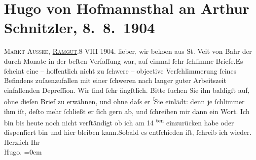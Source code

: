 

         
         \renewcommand{\erwaehntePersonen}{Personen: Hermann Bahr}
         \renewcommand{\erwaehnteOrte}{Orte: Bad Aussee, Ramgut, Sankt Veit, Wien}
         \renewcommand{\erwaehnteWerke}{}
               \section[Hugo von Hofmannsthal an Arthur Schnitzler, 8. 8. 1904]{ Hugo von Hofmannsthal an Arthur Schnitzler, 8. 8. 1904}\nopagebreak{}\rehead{ }\begin{ledgroupsized}[t]{13cm}\normalsize\beginnumbering \toendnotes[C]{\smallbreak\pagebreak[2]} 
\pstart
           {\pb}\textsc{Markt Aussee, \uline{Ramgut}.}\hfill 8 VIII 1904.\pend
           \pstart
           lieber, wir beko{\geminationm}en aus St. Veit von Bahr der durch Monate in der beſten Verfaſſung war, auf einmal ſehr
                    ſchlimme Briefe.\hspace*{1.5em}Es ſcheint eine – hoffentlich
                    nicht zu ſchwere – objective Verſchlimmerung ſeines Befindens zuſa{\geminationm}enzufallen mit einer ſchweren nach langer guter
                    Arbeitszeit {\pb}einfallenden
                    Depreſſion. Wir ſind ſehr ängſtlich. Bitte ſuchen Sie ihn baldigſt auf, ohne
                    dieſen Brief zu erwähnen, und ohne daſs er \substVorne{}\textsuperscript{ſ}\substDazwischen{}S\substHinten{}ie einlädt: denn je ſchlimmer ihm iſt, deſto mehr ſchließt er ſich gern
                    ab, und ſchreiben mir dann ein Wort.\pend
           \pstart
           Ich bin bis heute noch nicht verſtändigt ob ich am {\pb}14\textsuperscript{
                        ten} einzurücken habe oder dispenſiert bin und hier bleiben kann.\hspace*{1.5em}Sobald es entſchieden iſt, ſchreib ich
                    wieder.\pend
           \pstart
           Herzlich Ihr{\\[\baselineskip]}\spacefill\mbox{Hugo.}\pend
           \leftskip=0em{}
         
         \endnumbering{}\end{ledgroupsized}  \newcommand{\dateiname}{L01423}\newcommand{\titel}{Hugo von Hofmannsthal an Arthur Schnitzler, 8. 8. 1904}\newcommand{\editorInnen}{ Martin Anton Müller und Gerd-Hermann Susen}
      